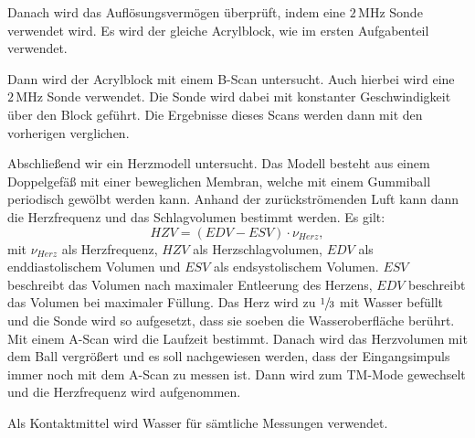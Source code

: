 \noindent Danach wird das Auflösungsvermögen überprüft, indem eine $2 \,\si{\mega\hertz}$
Sonde verwendet wird. Es wird der gleiche Acrylblock, wie im ersten Aufgabenteil verwendet.

\noindent Dann wird der Acrylblock mit einem B-Scan untersucht. Auch hierbei wird eine $2 \,\si{\mega\hertz}$
Sonde verwendet. Die Sonde wird dabei mit konstanter Geschwindigkeit über den Block geführt.
Die Ergebnisse dieses Scans werden dann mit den vorherigen verglichen.

\noindent Abschließend wir ein Herzmodell untersucht. Das Modell besteht aus
einem Doppelgefäß mit einer beweglichen Membran, welche mit einem Gummiball periodisch gewölbt werden
kann. Anhand der zurückströmenden Luft kann dann die Herzfrequenz und das Schlagvolumen
bestimmt werden. Es gilt:
\begin{equation}
  HZV = (EDV - ESV)\cdot  \nu_{Herz},
  \label{eqn:hzv}
\end{equation}
mit $\nu_{Herz}$ als Herzfrequenz, $HZV$ als Herzschlagvolumen, $EDV$ als
enddiastolischem Volumen und $ESV$ als endsystolischem Volumen.
$ESV$ beschreibt das Volumen nach maximaler Entleerung des Herzens, $EDV$
beschreibt das Volumen bei maximaler Füllung.
Das Herz wird zu $\sfrac{1}{3}$ mit Wasser befüllt und die Sonde wird so aufgesetzt,
dass sie soeben die Wasseroberfläche berührt. Mit einem A-Scan wird die Laufzeit
bestimmt. Danach wird das Herzvolumen mit dem Ball vergrößert und es soll nachgewiesen
werden, dass der Eingangsimpuls immer noch mit dem A-Scan zu messen ist.
Dann wird zum TM-Mode gewechselt und die Herzfrequenz wird aufgenommen.

\noindent Als Kontaktmittel wird Wasser für sämtliche Messungen verwendet.
